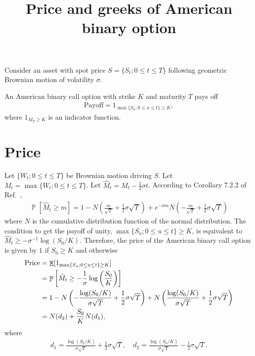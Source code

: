 \documentclass{article}
\def\Pr{\mathop{\mathbb{P}}}
\newcommand\Ex{\mathop{\mathbb{E}}}
\newcommand\br[1]{\left(#1\right)}
\newcommand\bbr[1]{\left[#1\right]}
\begin{document}
\title{Price and greeks of American binary option}
\date{}

\maketitle


Consider an asset with spot price $S = \{S_t; 0 \leq t \leq T\}$ following geometric Brownian motion of volatility $\sigma$.

An American binary call option with strike $K$ and maturity $T$ pays off
\begin{align}
    \text{Payoff}
        = 1_{\max\{S_u; 0 \leq u \leq t\} \geq K} ,
\end{align}
where
$1_{M_T \geq K}$ is an indicator function.


\section*{Price}


Let $\{W_t; 0 \leq t \leq T\}$ be Brownian motion driving $S$.
Let $M_t = \max\{W_t; 0 \leq t \leq T\}$.
Let $\hat M_t = M_t - \frac12 \sigma t$.
According to Corollary 7.2.2 of Ref.~\cite{shreve},
\begin{align}
    \Pr[\hat M_t \geq m]
        = 1 - N\br{\frac{m}{\sqrt{T}} + \frac12 \sigma \sqrt{T}}
            + e^{-\sigma m} N\br{-\frac{m}{\sqrt{T}} + \frac12 \sigma \sqrt{T}}
\end{align}
where
$N$ is the cumulative distribution function of the normal distribution.
The condition to get the payoff of unity, $\max\{S_u; 0 \leq u \leq t\} \geq K$, is equivalent to $\hat M_t \geq - \sigma^{-1} \log(S_0 / K)$.
Therefore, the price of the American binary call option is given by
$1$ if $S_0 \geq K$ and otherwise
\begin{align}
    \text{Price}
        & = \Ex[1_{\max\{S_u; 0 \leq u \leq t\} \geq K}] \notag \\
        & = \Pr\bbr{\hat M_t \geq - \frac{1}{\sigma}\log\br{\frac{S_0}{K}}} \notag \\
        & = 1 - N\br{- \frac{\log(S_0 / K)}{\sigma \sqrt{T}} + \frac12 \sigma \sqrt{T}}
            + N\br{\frac{\log(S_0 / K)}{\sigma \sqrt{T}} + \frac12 \sigma \sqrt{T}}
            \notag \\
        & = N(d_2) + \frac{S_0}{K} N(d_1) ,
\end{align}
where
\begin{align}
    d_1
        = \frac{\log (S_0 / K)}{\sigma \sqrt{T}} + \frac12 \sigma \sqrt{T} ,
    \quad
    d_2
        = \frac{\log (S_0 / K)}{\sigma \sqrt{T}} - \frac12 \sigma \sqrt{T} .
\end{align}
\end{document}

